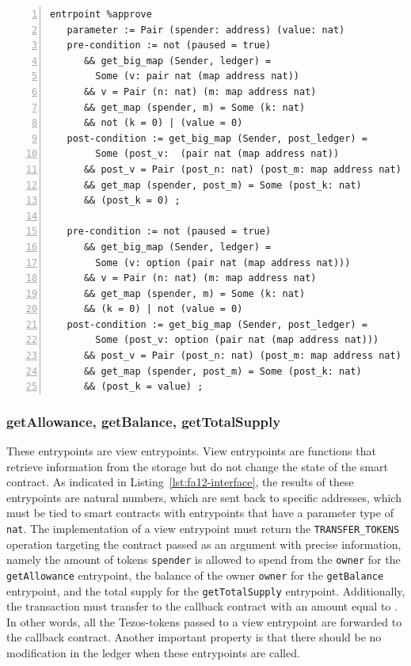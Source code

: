\documentclass[a4paper,USenglish,cleveref, autoref, thm-restate]{lipics-v2021}
\begin{document}
\begin{lstlisting}[float=tp,captionpos=b,caption={Specification of the \lstinline/approve/ entrypoint},label={lst:specification-approve},numbers=left]
entrpoint %approve
   parameter := Pair (spender: address) (value: nat)
   pre-condition := not (paused = true)
      && get_big_map (Sender, ledger) = 
        Some (v: pair nat (map address nat))
      && v = Pair (n: nat) (m: map address nat) 
      && get_map (spender, m) = Some (k: nat) 
      && not (k = 0) | (value = 0)
   post-condition := get_big_map (Sender, post_ledger) = 
        Some (post_v:  (pair nat (map address nat))
      && post_v = Pair (post_n: nat) (post_m: map address nat) 
      && get_map (spender, post_m) = Some (post_k: nat) 
      && (post_k = 0) ;

   pre-condition := not (paused = true) 
      && get_big_map (Sender, ledger) = 
        Some (v: option (pair nat (map address nat))) 
      && v = Pair (n: nat) (m: map address nat) 
      && get_map (spender, m) = Some (k: nat) 
      && (k = 0) | not (value = 0)
   post-condition := get_big_map (Sender, post_ledger) = 
        Some (post_v: option (pair nat (map address nat))) 
      && post_v = Pair (post_n: nat) (post_m: map address nat) 
      && get_map (spender, post_m) = Some (post_k: nat) 
      && (post_k = value) ;
\end{lstlisting}

\subsubsection{getAllowance, getBalance,  getTotalSupply}
\label{sec:getall-getb-gett}

These entrypoints are view entrypoints. View entrypoints are functions
that retrieve information from the storage but do not change the state
of the smart contract. As indicated in
Listing~\ref{lst:fa12-interface}, the results of these entrypoints are
natural numbers, which are sent back to specific addresses, which must
be tied to smart contracts with entrypoints that have a parameter type
of \lstinline/nat/. The implementation of a view entrypoint must
return the \lstinline/TRANSFER_TOKENS/ operation targeting the
contract passed as an argument with precise information, namely the
amount of tokens \lstinline/spender/ is allowed to spend from the
\lstinline/owner/ for the \lstinline/getAllowance/ entrypoint, the
balance of the owner \lstinline/owner/ for the \lstinline/getBalance/
entrypoint, and the total supply for the \lstinline/getTotalSupply/
entrypoint. Additionally, the transaction must transfer to the
callback contract with an amount equal to \AMOUNT. In other words, all
the Tezos-tokens passed to a view entrypoint are forwarded to the
callback contract. Another important property is that there should be
no modification in the ledger when these entrypoints are called. 
\end{document}
